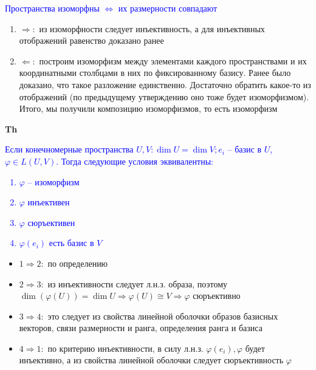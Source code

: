 \textcolor{blue}{Пространства изоморфны $\Leftrightarrow$ их размерности совпадают}

\begin{enumerate}
    \item $\Rightarrow:$ из изоморфности следует инъективность, а для инъективных отображений равенство доказано ранее
    \item $\Leftarrow:$ построим изоморфизм между элементами каждого пространствами и их координатными столбцами в
    них по фиксированному базису.
    Ранее было доказано, что такое разложение единственно.
    Достаточно обратить какое-то из отображений (по предыдущему утверждению оно тоже будет изоморфизмом).
    Итого, мы получили композицию изоморфизмов, то есть изоморфизм
\end{enumerate}

\textbf{Th} \textcolor{blue}{Если конечномерные пространства $U, V: \dim U = \dim V; e_i$ -- базис в $U$,
    $\varphi \in L(U,V)$. Тогда следующие условия эквивалентны:
    \begin{enumerate}
        \item $\varphi$ -- изоморфизм
        \item $\varphi$ инъективен
        \item $\varphi$ сюръективен
        \item $\varphi (e_i)$ есть базис в $V$
    \end{enumerate}         }

\begin{itemize}
    \item $1 \Rightarrow 2:$ по определению
    \item $2 \Rightarrow 3:$ из инъективности следует л.н.з. образа, поэтому $\dim (\varphi(U)) = \dim U \Rightarrow \varphi(U) \cong V
    \Rightarrow \varphi$ сюръективно
    \item $3 \Rightarrow 4:$ это следует из свойства линейной оболочки образов базисных векторов, связи
    размерности и ранга, определения ранга и базиса
    \item $4 \Rightarrow 1:$ по критерию инъективности, в силу л.н.з. $\varphi (e_i), \varphi$ будет инъективно,
    а из свойства линейной оболочки следует сюръективность $\varphi$
\end{itemize}